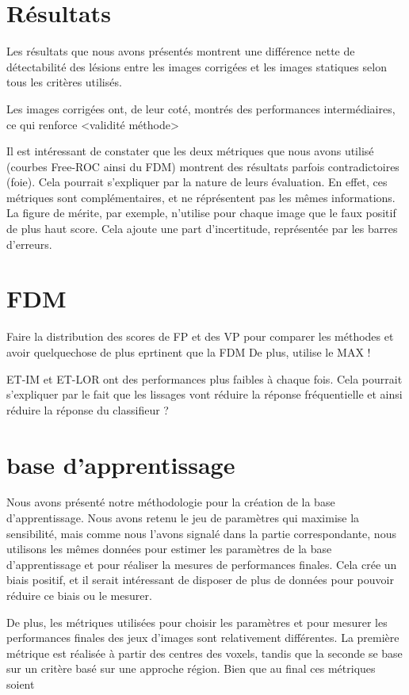 \section{Résultats}

Les résultats que nous avons présentés montrent une différence nette de détectabilité des lésions entre les images corrigées et les images statiques selon tous les critères utilisés.

Les images corrigées ont, de leur coté, montrés des performances intermédiaires, ce qui renforce  <validité méthode>

Il est intéressant de constater que les deux métriques que nous avons utilisé (courbes Free-ROC ainsi du FDM) montrent des résultats parfois contradictoires (foie). Cela pourrait s'expliquer par la nature de leurs évaluation. En effet, ces métriques sont complémentaires, et ne réprésentent pas les mêmes informations. La figure de mérite, par exemple, n'utilise pour chaque image que le faux positif de plus haut score. Cela ajoute une part d'incertitude, représentée par les barres d'erreurs.

\section{FDM}

Faire la distribution des scores de FP et des VP pour comparer les méthodes et avoir quelquechose de plus eprtinent que la FDM
De plus, utilise le MAX !

ET-IM et ET-LOR ont des performances plus faibles à chaque fois. Cela pourrait s'expliquer par le fait que les lissages vont réduire la réponse fréquentielle et ainsi réduire la réponse du classifieur ?

\section{base d'apprentissage}

Nous avons présenté notre méthodologie pour la création de la base d'apprentissage. Nous avons retenu le jeu de paramètres qui maximise la sensibilité, mais comme nous l'avons signalé dans la partie correspondante, nous utilisons les mêmes données pour estimer les paramètres de la base d'apprentissage et pour réaliser la mesures de performances finales. Cela crée un biais positif, et il serait intéressant de disposer de plus de données pour pouvoir réduire ce biais ou le mesurer.

De plus, les métriques utilisées pour choisir les paramètres et pour mesurer les performances finales des jeux d'images sont relativement différentes. La première métrique est réalisée à partir des centres des voxels, tandis que la seconde se base sur un critère basé sur une approche région. Bien que au final ces métriques soient 


